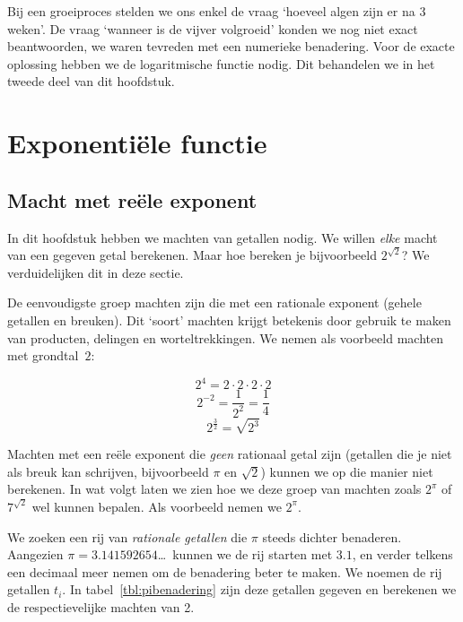 Bij een groeiproces stelden we ons enkel de vraag `hoeveel algen zijn er na 3 weken'. De vraag `wanneer is de vijver volgroeid' konden we nog niet exact beantwoorden, we waren tevreden met een numerieke benadering. Voor de exacte oplossing hebben we de logaritmische functie nodig. Dit behandelen we in het tweede deel van dit hoofdstuk.

\section{ Exponenti\"{e}le functie}\label{sec.expfunctie}
\subsection{Macht met re\"ele exponent}\label{subsec:macht}
In dit hoofdstuk hebben we machten van getallen nodig. We willen \emph{elke} macht van een gegeven getal berekenen. Maar hoe bereken je bijvoorbeeld $2^{\sqrt 2}$? We verduidelijken dit in deze sectie.

De eenvoudigste groep machten zijn die  met een rationale exponent (gehele getallen en breuken).
Dit `soort' machten krijgt betekenis door gebruik te maken van
producten, delingen en worteltrekkingen. We nemen als voorbeeld machten met grondtal~$2$:

\begin{displaymath}
    2^{4}=2\cdot 2\cdot 2\cdot 2
\end{displaymath}
\begin{displaymath}
    2^{-2}=\frac{1}{2^{2}}=\frac{1}{4}
\end{displaymath}
\begin{displaymath}
    2^{\frac{3}{2}}=\sqrt{2^{3}}
\end{displaymath}

Machten met een re\"ele exponent die \emph{geen} rationaal getal zijn (getallen die je niet als breuk kan schrijven, bijvoorbeeld $\pi$ en  $\sqrt{2}$) kunnen we op die manier niet berekenen.
In wat volgt laten we zien hoe we deze groep van machten zoals $2^{\pi}$ of $7^{\sqrt{2}}$ wel kunnen bepalen.
Als voorbeeld nemen we $2^{\pi}$.

We zoeken een rij van \emph{rationale getallen} die $\pi$ steeds dichter
benaderen.
Aangezien $\pi=\num{3.141592654}$\dots\ kunnen we de rij starten met $\num{3.1}$,
en verder telkens een decimaal meer nemen om de benadering beter te
maken. We noemen de rij getallen $t_{i}$. In tabel~\ref{tbl:pibenadering}
zijn deze getallen gegeven en
berekenen we de respectievelijke machten van 2.

